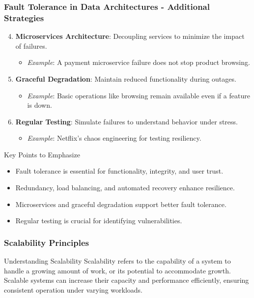 \documentclass{beamer}
\begin{document}
\begin{frame}[fragile]
    \frametitle{Fault Tolerance in Data Architectures - Additional Strategies}
    \begin{enumerate}
        \setcounter{enumi}{3}
        \item \textbf{Microservices Architecture}: Decoupling services to minimize the impact of failures.
        \begin{itemize}
            \item \textit{Example}: A payment microservice failure does not stop product browsing.
        \end{itemize}

        \item \textbf{Graceful Degradation}: Maintain reduced functionality during outages.
        \begin{itemize}
            \item \textit{Example}: Basic operations like browsing remain available even if a feature is down.
        \end{itemize}
        
        \item \textbf{Regular Testing}: Simulate failures to understand behavior under stress.
        \begin{itemize}
            \item \textit{Example}: Netflix's chaos engineering for testing resiliency.
        \end{itemize}
    \end{enumerate}
    
    \begin{block}{Key Points to Emphasize}
        \begin{itemize}
            \item Fault tolerance is essential for functionality, integrity, and user trust.
            \item Redundancy, load balancing, and automated recovery enhance resilience.
            \item Microservices and graceful degradation support better fault tolerance.
            \item Regular testing is crucial for identifying vulnerabilities.
        \end{itemize}
    \end{block}
\end{frame}

\begin{frame}[fragile]
    \frametitle{Scalability Principles}
    \begin{block}{Understanding Scalability}
        Scalability refers to the capability of a system to handle a growing amount of work, or its potential to accommodate growth. Scalable systems can increase their capacity and performance efficiently, ensuring consistent operation under varying workloads.
    \end{block}
\end{frame}
\end{document}

